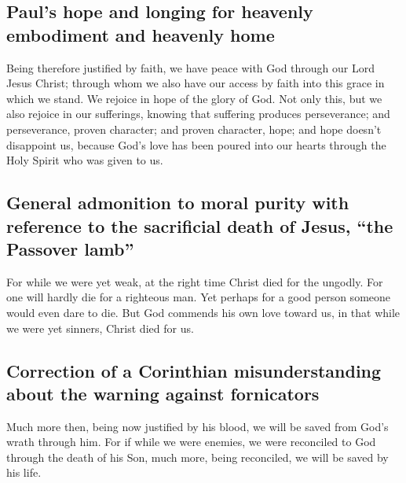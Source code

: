 \hypertarget{pauls-hope-and-longing-for-heavenly-embodiment-and-heavenly-home}{%
\subsection{Paul's hope and longing for heavenly embodiment and heavenly
home}\label{pauls-hope-and-longing-for-heavenly-embodiment-and-heavenly-home}}

 Being therefore justified by faith, we have peace with
God through our Lord Jesus Christ;  through whom we also
have our access by faith into this grace in which we stand. We rejoice
in hope of the glory of God.  Not only this, but we also
rejoice in our sufferings, knowing that suffering produces perseverance;
 and perseverance, proven character; and proven character,
hope;  and hope doesn't disappoint us, because God's love
has been poured into our hearts through the Holy Spirit who was given to
us.

\hypertarget{general-admonition-to-moral-purity-with-reference-to-the-sacrificial-death-of-jesus-the-passover-lamb}{%
\subsection{General admonition to moral purity with reference to the
sacrificial death of Jesus, ``the Passover
lamb''}\label{general-admonition-to-moral-purity-with-reference-to-the-sacrificial-death-of-jesus-the-passover-lamb}}

 For while we were yet weak, at the right time Christ died
for the ungodly.  For one will hardly die for a righteous
man. Yet perhaps for a good person someone would even dare to die.
 But God commends his own love toward us, in that while we
were yet sinners, Christ died for us.

\hypertarget{correction-of-a-corinthian-misunderstanding-about-the-warning-against-fornicators}{%
\subsection{Correction of a Corinthian misunderstanding about the
warning against
fornicators}\label{correction-of-a-corinthian-misunderstanding-about-the-warning-against-fornicators}}

 Much more then, being now justified by his blood, we will
be saved from God's wrath through him.  For if while we
were enemies, we were reconciled to God through the death of his Son,
much more, being reconciled, we will be saved by his life.

